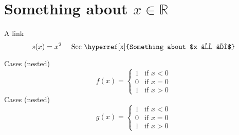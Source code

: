 \documentclass{article}
\begin{document}
\section{\label{x}Something about $x ∈ ℝ$}

A link 
\[
  s(x) = x^2 \quad \text{ See \hyperref[x]{Something about $x ∈ ℝ$}}
\]

Cases (nested)
\[
f(x)=
\begin{cases}
  1 & \text{if $x<0$} \\
  0 & \text{if $x=0$} \\
  1 & \text{if $x>0$}          
\end{cases}
\]
Cases (nested)
\[
g(x)=
\begin{cases}
  1 & \text{if } x<0 \\
  0 & \text{if } x=0 \\
  1 & \text{if } x>0          
\end{cases}
\]
\end{document}
